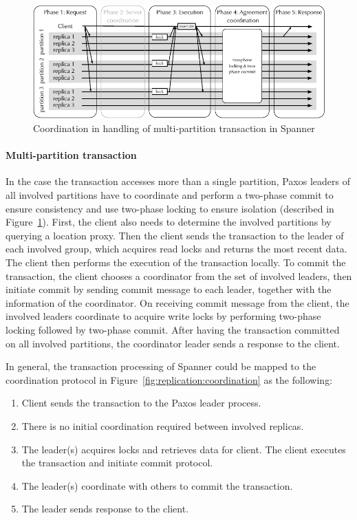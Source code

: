 \begin{figure}
  \begin{minipage}[b]{1.0\linewidth}
  \centering
        \includegraphics[width=1\linewidth]{figures/spanner-multi-partition}
  \end{minipage}
  \caption{Coordination in handling of multi-partition transaction in Spanner}
  \label{fig:spanner-multi-partition}
\end{figure}

\paragraph{Multi-partition transaction} In the case the transaction accesses
more than a single partition, Paxos leaders of all involved partitions have to
coordinate and perform a two-phase commit to ensure consistency and use
two-phase locking to ensure isolation (described in
Figure~\ref{fig:spanner-multi-partition}). First, the client also needs to determine
the involved partitions by querying a location proxy. Then the client sends the
transaction to the leader of each involved group, which acquires read locks and
returns the most recent data. The client then performs the execution of the
transaction locally. To commit the transaction, the client chooses a coordinator
from the set of involved leaders, then initiate commit by sending commit message
to each leader, together with the information of the coordinator. On receiving
commit message from the client, the involved leaders coordinate to acquire write
locks by performing two-phase locking followed by two-phase commit. After having
the transaction committed on all involved partitions, the coordinator leader
sends a response to the client.

In general, the transaction processing of Spanner could be mapped to the
coordination protocol in Figure~\ref{fig:replication:coordination} as the
following:
\begin{enumerate}
  \item Client sends the transaction to the Paxos leader process.
  \item There is no initial coordination required between involved replicas.
  \item The leader(s) acquires locks and retrieves data for client. The client
  executes the transaction and initiate commit protocol.
  \item The leader(s) coordinate with others to commit the transaction.
  \item The leader sends response to the client.
\end{enumerate}

